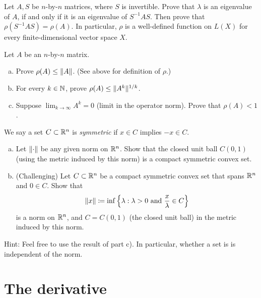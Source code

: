 \begin{exercise}
Let $A,S$ be $n$-by-$n$ matrices, where $S$ is invertible.
Prove that $\lambda$ is an eigenvalue of $A$, if and only
if it is an eigenvalue of $S^{-1}AS$.  Then prove that
$\rho(S^{-1}AS) = \rho(A)$.
In particular, $\rho$ is a well-defined function on $L(X)$ for
every finite-dimensional vector space $X$.
\end{exercise}

\begin{exercise}
\pagebreak[2]
Let $A$ be an $n$-by-$n$ matrix.
\begin{enumerate}[a)]
\item
Prove $\rho(A) \leq \lVert {A} \rVert$.  (See above for definition of $\rho$.)
\item
For every $k \in {\mathbb{N}}$, prove
$\rho(A) \leq \lVert {A^k} \rVert^{1/k}$.
\item
Suppose $\displaystyle \lim_{k\to\infty} A^k = 0$ (limit in the operator norm).
Prove that $\rho(A) < 1$.
\end{enumerate}
\end{exercise}

\begin{exercise}
We say a set $C \subset {\mathbb{R}}^n$ is \emph{symmetric} if
$x \in C$ implies $-x \in C$.
\begin{enumerate}[a)]
\item
Let $\lVert {\cdot} \rVert$ be any given norm on ${\mathbb{R}}^n$.  Show that the closed unit ball
$C(0,1)$ (using the metric induced by this norm)
is a compact symmetric convex set.
\item (Challenging)
Let $C \subset {\mathbb{R}}^n$ be a compact
symmetric convex set that spans ${\mathbb{R}}^n$ and $0 \in C$.  Show that
\begin{equation*}
\lVert {x} \rVert \coloneqq \inf \left\{ \lambda : \lambda > 0 \text{ and } \frac{x}{\lambda} \in C \right\}
\end{equation*}
is a norm on ${\mathbb{R}}^n$, and $C = C(0,1)$ (the closed unit ball) in the metric induced by this norm.
\end{enumerate}
Hint: Feel free to use the result of 
part c).  In particular, whether a set is  is independent of the
norm.
\end{exercise}


\sectionnewpage
\section{The derivative}
\label{sec:svtheder}

